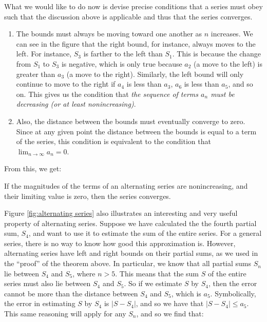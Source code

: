 \documentclass{myarticle}
\theoremstyle{nospace}
\newtheorem{old series theorem}{Theorem}
\newenvironment{series theorem}
{\begin{mdframed}\begin{old series theorem}}
    {\end{old series theorem}\end{mdframed}}
\begin{document}
What we would like to do now is devise precise conditions that a
series must obey such that the discussion above is applicable and thus
that the series converges.

\begin{enumerate}
\item The bounds must always be moving toward one another as $n$
  increases. We can see in the figure that the right bound, for
  instance, always moves to the left. For instance, $S_3$ is farther
  to the left than $S_1$. This is because the change from $S_1$ to
  $S_3$ is negative, which is only true because $a_2$ (a move to the
  left) is greater than $a_3$ (a move to the right). Similarly, the
  left bound will only continue to move to the right if $a_4$ is less
  than $a_3$, $a_6$ is less than $a_5$, and so on. This gives us the
  condition that \emph{the sequence of terms $a_n$ must be decreasing
    (or at least nonincreasing)}.
\item Also, the distance between the bounds must eventually converge
  to zero. Since at any given point the distance between the bounds is
  equal to a term of the series, this condition is equivalent to the
  condition that \emph{$\lim_{n \to \infty} a_n = 0$}.
\end{enumerate}

From this, we get:

\begin{series theorem}
  If the magnitudes of the terms of an alternating series are
  nonincreasing, and their limiting value is zero, then the series
  converges.
\end{series theorem}

Figure \ref{fig:alternating series} also illustrates an interesting
and very useful property of alternating series. Suppose we have
calculated the the fourth partial sum, $S_4$, and want to use it to
estimate the sum of the entire series. For a general series, there is
no way to know how good this approximation is. However, alternating
series have left and right bounds on their partial sums, as we used in
the ``proof'' of the theorem above. In particular, we know that all
partial sums $S_n$ lie between $S_4$ and $S_5$, where $n > 5$. This
means that the sum $S$ of the entire series must also lie between
$S_4$ and $S_5$. So if we estimate $S$ by $S_4$, then the error cannot
be more than the distance between $S_4$ and $S_5$, which is $a_5$.
Symbolically, the error in estimating $S$ by $S_4$ is $|S - S_4|$, and
so we have that $|S - S_4| \leq a_5$. This same reasoning will apply
for any $S_n$, and so we find that:
\end{document}
